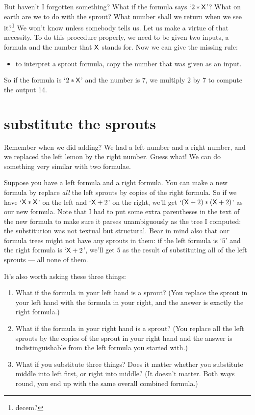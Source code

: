 \documentclass{book}
\begin{document}
But haven't I forgotten something? What if the formula says `$2*\mathsf{X}$'? What on earth are we to do with the sprout? What number shall we return when we see it?\footnote{decem?} We won't know unless somebody tells us. Let us make a virtue of that necessity. To do this procedure properly, we need to be given two inputs, a formula and the number that $\mathsf{X}$ stands for. Now we can give the missing rule:
\begin{itemize}
\item to interpret a sprout formula, copy the number that was given as an input.
\end{itemize}

So if the formula is `$2*\mathsf{X}$' and the number is 7, we multiply 2 by 7 to compute the output 14.


\section{substitute the sprouts}

Remember when we did adding? We had a left number and a right number, and we replaced the left lemon by the right number. Guess what! We can do something very similar with two formulae.

Suppose you have a left formula and a right formula. You can make a new formula by replace \emph{all} the left sprouts by copies of the right formula. So if we have `$\mathsf{X}*\mathsf{X}$' on the left and `$\mathsf{X}+2$' on the right, we'll get `$(\mathsf{X}+2)*(\mathsf{X}+2)$' as our new formula. Note that I had to put some extra parentheses in the text of the new formula to make sure it parses unambiguously as the tree I computed: the substitution was not textual but structural. Bear in mind also that our formula trees might not have any sprouts in them: if the left formula is `$5$' and the right formula is `$\mathsf{X}+2$', we'll get $5$ as the result of substituting all of the left sprouts --- all none of them.

It's also worth asking these three things:
\begin{enumerate}
\item What if the formula in your left hand is a sprout? (You replace the sprout in your left hand with the formula in your right, and the answer is exactly the right formula.)
\item What if the formula in your right hand is a sprout? (You replace all the left sprouts by the copies of the sprout in your right hand and the answer is indistinguishable from the left formula you started with.)
\item What if you substitute three things? Does it matter whether you substitute middle into left first, or right into middle? (It doesn't matter. Both ways round, you end up with the same overall combined formula.)
\end{enumerate}
\end{document}
